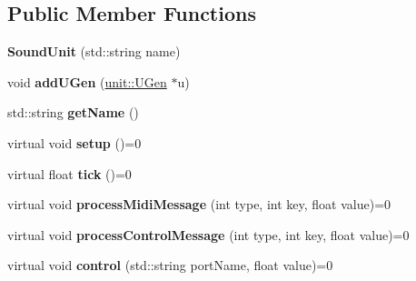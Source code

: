 \subsection*{Public Member Functions}
\begin{DoxyCompactItemize}
\item 
{\bfseries Sound\+Unit} (std\+::string name)\hypertarget{classunit_1_1SoundUnit_a3220665fe1e433d1b0d90fa328e71133}{}\label{classunit_1_1SoundUnit_a3220665fe1e433d1b0d90fa328e71133}

\item 
void {\bfseries add\+U\+Gen} (\hyperlink{classunit_1_1UGen}{unit\+::\+U\+Gen} $\ast$u)\hypertarget{classunit_1_1SoundUnit_a3c4fb09e94703dd7f7d17ca5cb7bb561}{}\label{classunit_1_1SoundUnit_a3c4fb09e94703dd7f7d17ca5cb7bb561}

\item 
std\+::string {\bfseries get\+Name} ()\hypertarget{classunit_1_1SoundUnit_a4854dfb9b839ff33d061ed013fbf3ef9}{}\label{classunit_1_1SoundUnit_a4854dfb9b839ff33d061ed013fbf3ef9}

\item 
virtual void {\bfseries setup} ()=0\hypertarget{classunit_1_1SoundUnit_aedfa9b99f4555ed5df4ceffe001c1e63}{}\label{classunit_1_1SoundUnit_aedfa9b99f4555ed5df4ceffe001c1e63}

\item 
virtual float {\bfseries tick} ()=0\hypertarget{classunit_1_1SoundUnit_af1f6ccffb8d1919bd774b340c01bea68}{}\label{classunit_1_1SoundUnit_af1f6ccffb8d1919bd774b340c01bea68}

\item 
virtual void {\bfseries process\+Midi\+Message} (int type, int key, float value)=0\hypertarget{classunit_1_1SoundUnit_a1e73f915afac67a2103f8d79daf40ec3}{}\label{classunit_1_1SoundUnit_a1e73f915afac67a2103f8d79daf40ec3}

\item 
virtual void {\bfseries process\+Control\+Message} (int type, int key, float value)=0\hypertarget{classunit_1_1SoundUnit_ad20e07c321b9d206f0f9303bbdf2a67d}{}\label{classunit_1_1SoundUnit_ad20e07c321b9d206f0f9303bbdf2a67d}

\item 
virtual void {\bfseries control} (std\+::string port\+Name, float value)=0\hypertarget{classunit_1_1SoundUnit_a0a74ef3d6c9343f1ee64a9a96bdbbe78}{}\label{classunit_1_1SoundUnit_a0a74ef3d6c9343f1ee64a9a96bdbbe78}

\end{DoxyCompactItemize}
